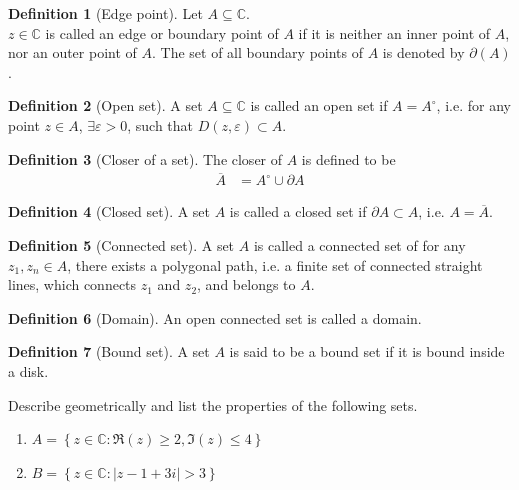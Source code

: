 \documentclass[fleqn, a4paper, 12pt, twoside]{article}
\theoremstyle{definition}
\newtheorem{definition}{Definition}
\theoremstyle{theorem}
\newcommand{\boundary}{\partial}
\begin{document}
\begin{definition}[Edge point]
	Let $A \subseteq \mathbb{C}$.\\
	$z \in \mathbb{C}$ is called an edge or boundary point of $A$ if it is neither an inner point of $A$, nor an outer point of $A$.
	The set of all boundary points of $A$ is denoted by $\boundary(A)$.
\end{definition}

\begin{definition}[Open set]
	A set $A \subseteq \mathbb{C}$ is called an open set if $A = A^{\circ}$, i.e. for any point $z \in A$, $\exists \varepsilon > 0$, such that $D(z,\varepsilon) \subset A$.
\end{definition}

\begin{definition}[Closer of a set]
	The closer of $A$ is defined to be
	\begin{align*}
		\overline{A} &= A^{\circ} \cup \boundary A
	\end{align*}
\end{definition}

\begin{definition}[Closed set]
	A set $A$ is called a closed set if $\boundary A \subset A$, i.e. $A = \overline{A}$.
\end{definition}

\begin{definition}[Connected set]
	A set $A$ is called a connected set of for any $z_1,z_n \in A$, there exists a polygonal path, i.e. a finite set of connected straight lines, which connects $z_1$ and $z_2$, and belongs to $A$.
\end{definition}

\begin{definition}[Domain]
	An open connected set is called a domain.
\end{definition}

\begin{definition}[Bound set]
	A set $A$ is said to be a bound set if it is bound inside a disk.
\end{definition}

\begin{question}
	Describe geometrically and list the properties of the following sets.
	\begin{enumerate}
		\item $A = \left\{ z \in \mathbb{C} : \Re(z) \ge 2 , \Im(z) \le 4 \right\}$
		\item $B = \left\{ z \in \mathbb{C} : |z - 1 + 3 i| > 3 \right\}$
	\end{enumerate}
\end{question}
\end{document}
